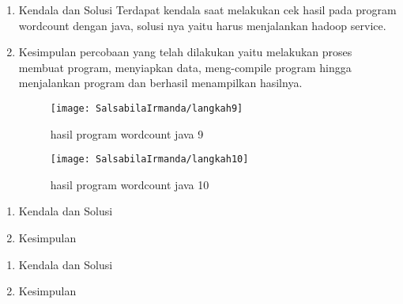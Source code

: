 \begin{enumerate}
\item Kendala dan Solusi
Terdapat kendala saat melakukan cek hasil pada program wordcount dengan java, solusi nya yaitu harus menjalankan hadoop service. 

\item Kesimpulan
percobaan yang telah dilakukan yaitu melakukan proses membuat program, menyiapkan data, meng-compile program hingga menjalankan program dan berhasil menampilkan hasilnya.

\begin{figure}[!ht]
\texttt{[image: SalsabilaIrmanda/langkah9]}
\caption{hasil program wordcount java 9}
\label{gam:hasil}
\end{figure}

\begin{figure}[!ht]
\texttt{[image: SalsabilaIrmanda/langkah10]}
\caption{hasil program wordcount java 10}
\label{gam:hasil}
\end{figure}

\end{enumerate}


\begin{enumerate}
\item Kendala dan Solusi

\item Kesimpulan

\end{enumerate}

\begin{enumerate}
\item Kendala dan Solusi

\item Kesimpulan

\end{enumerate}